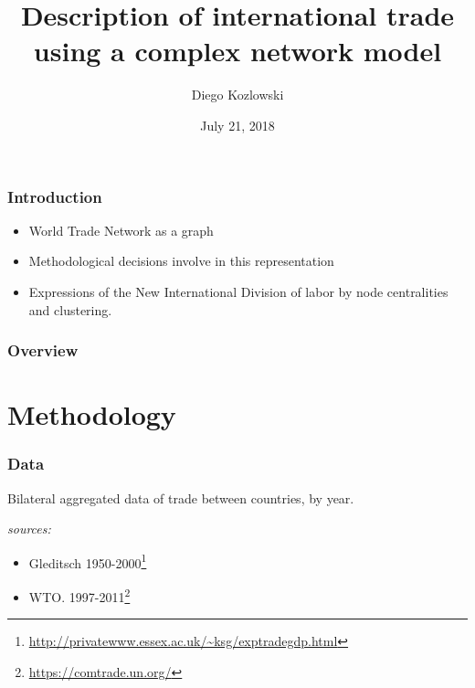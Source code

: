 \documentclass[professionalfont,fleqn]{beamer}
\title[Word Trade Network]{Description of international trade using a complex network model} %
\author{Diego Kozlowski} %
\institute[University of Buenos Aires] %
		{
		University of Buenos Aires\\ %
		\medskip
		\textit{diegokoz92@gmail.com} %
		}
\date{July 21, 2018} %
\begin{document}
		
		\begin{frame}
		\titlepage %
		\end{frame}
		
		
		\begin{frame}
		\frametitle{Introduction}
		\begin{itemize}
			\item World Trade Network as a graph
			\item Methodological decisions involve in this representation
			\item Expressions of the New International Division of labor by node centralities and clustering. 
		\end{itemize}
		
		\end{frame}
		
		\begin{frame}
		\frametitle{Overview} %
		\tableofcontents %
		\end{frame}
		
		
		\section{Methodology} %
	
	
		
		\begin{frame}
		\frametitle{Data}
		Bilateral aggregated data of trade between countries, by year.
		
		\vspace*{10px}
		
		\textit{sources:}  
		\begin{itemize}
			\item {Gleditsch 1950-2000}\footnote{\url{http://privatewww.essex.ac.uk/~ksg/exptradegdp.html}}
			\item {WTO. 1997-2011}\footnote{\url{https://comtrade.un.org/}}
		\end{itemize}
		
		\end{frame}
		
\end{document}
